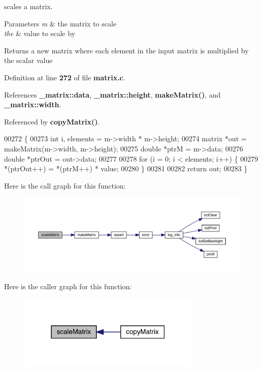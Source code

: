 scales a matrix. 


\begin{DoxyParams}{Parameters}
{\em m} & the matrix to scale \\
\hline
{\em the} & value to scale by \\
\hline
\end{DoxyParams}
\begin{DoxyReturn}{Returns}
a new matrix where each element in the input matrix is multiplied by the scalar value 
\end{DoxyReturn}


Definition at line \textbf{ 272} of file \textbf{ matrix.\+c}.



References \textbf{ \+\_\+matrix\+::data}, \textbf{ \+\_\+matrix\+::height}, \textbf{ make\+Matrix()}, and \textbf{ \+\_\+matrix\+::width}.



Referenced by \textbf{ copy\+Matrix()}.


\begin{DoxyCode}
00272                                              \{
00273   \textcolor{keywordtype}{int} i, elements = m->width * m->height;
00274   matrix *out = makeMatrix(m->width, m->height);
00275   \textcolor{keywordtype}{double} *ptrM = m->data;
00276   \textcolor{keywordtype}{double} *ptrOut = out->data;
00277 
00278   \textcolor{keywordflow}{for} (i = 0; i < elements; i++) \{
00279     *(ptrOut++) = *(ptrM++) * value;
00280   \}
00281 
00282   \textcolor{keywordflow}{return} out;
00283 \}
\end{DoxyCode}
Here is the call graph for this function\+:
\nopagebreak
\begin{figure}[H]
\begin{center}
\leavevmode
\includegraphics[width=350pt]{matrix_8c_a6b7faa6ba9ee987d0777d9d0bd0e7b32_cgraph}
\end{center}
\end{figure}
Here is the caller graph for this function\+:
\nopagebreak
\begin{figure}[H]
\begin{center}
\leavevmode
\includegraphics[width=247pt]{matrix_8c_a6b7faa6ba9ee987d0777d9d0bd0e7b32_icgraph}
\end{center}
\end{figure}
\mbox{\label{matrix_8c_a4794df8b2032f961dd8b2d90276bc417}} 
